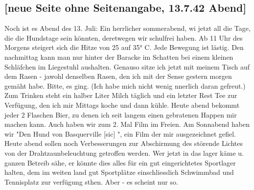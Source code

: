 \subsection{{\color{red} [neue Seite ohne Seitenangabe, 13.7.42 Abend] }}

Noch ist es Abend des 13. Juli: Ein herrlicher sommerabend, wi jetzt all die Tage, die die Hundstage sein k\"{o}nnten, deretwegen wir schulfrei haben.
Ab 11 Uhr des Morgens steigert sich die Hitze von 25 auf 35° C.
Jede Bewegung ist l\"{a}stig.
Den nachmittag kann man nur hinter der Baracke im Schatten bei einem kleinen Schl\"{a}fchen im Liegestuhl aushalten.
Genauso sitze ich jetzt mit meinem Tisch auf dem Rasen - jawohl denselben Rasen, den ich mit der Sense gestern morgen gem\"{a}ht habe.
Bitte, es ging.
(Ich habe mich nicht wenig nnerlich daran gefreut.)
Zum Trinken steht ein halber Liter Milch t\"{a}glich und ein letzter Rest Tee zur Verf\"{u}gung, den ich mir Mittags koche und dann k\"{u}hle.
Heute abend bekommt jeder 2 Flaschen Bier, zu denen ich seit langem einen gebratenen Happen mir machen kann.
Auch haben wir zum 2. Mal Film im Freien.
Am Sonnabend haben wir "Den Hund von Basquerville{\color{red} [sic] }", ein Film der mir ausgezeichnet gefiel.
Heute abend sollen noch Verbesserungen zur Abschirmung des st\"{o}rende Lichtes von der Drahtzaunbeleuchtung getroffen werden.
Wer jetzt in das lager k\"{a}me u. ganzen Betreib s\"{a}he, er k\"{o}nnte dies alles f\"{u}r ein gut eingerichtetes Sportlager halten, dem im weiten land gut Sportpl\"{a}tze einschliesslich Schwimmbad und Tennisplatz zur verf\"{u}gung sthen.
Aber - es scheint nur so.

\clearpage
